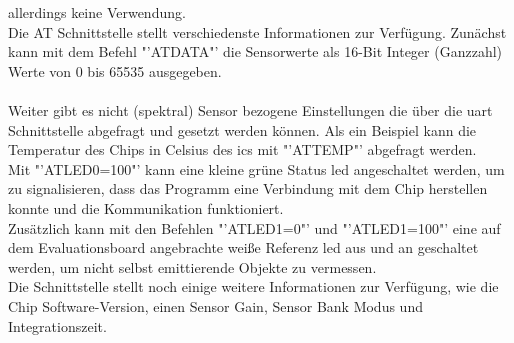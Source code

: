 \documentclass[11pt]{scrartcl}
\begin{document}
allerdings keine Verwendung.\\
Die AT Schnittstelle stellt verschiedenste Informationen zur Verfügung. Zunächst kann mit dem Befehl "'ATDATA"' die Sensorwerte als
16-Bit Integer (Ganzzahl) Werte von 0 bis 65535 ausgegeben.\\
\\
Weiter gibt es nicht (spektral) Sensor bezogene Einstellungen die über die \ac{uart} Schnittstelle abgefragt und gesetzt werden können.
Als ein Beispiel kann die Temperatur des Chips in Celsius des \ac{ic}s mit "'ATTEMP"' abgefragt werden.\\
Mit "'ATLED0=100"' kann eine kleine grüne Status \ac{led} angeschaltet werden, um zu signalisieren, dass das Programm eine Verbindung mit 
dem Chip herstellen konnte und die Kommunikation funktioniert.\\
Zusätzlich kann mit den Befehlen "'ATLED1=0"' und "'ATLED1=100"' eine auf dem Evaluationsboard angebrachte weiße Referenz \ac{led} aus und
an geschaltet werden, um nicht selbst emittierende Objekte zu vermessen.\\
Die Schnittstelle stellt noch einige weitere Informationen zur Verfügung, wie die Chip Software-Version, einen Sensor Gain, Sensor Bank Modus
und Integrationszeit.
\end{document}
